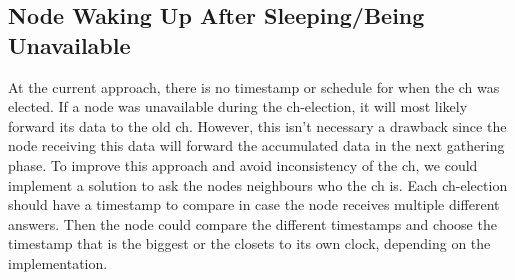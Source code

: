 \documentclass[USenglish]{uit-thesis}
\begin{document}



\subsection{Node Waking Up After Sleeping/Being Unavailable}




At the current approach, there is no timestamp or schedule for when the \gls{ch} was elected. If a node was unavailable during the \gls{ch}-election, it will most likely forward its data to the old \gls{ch}. However, this isn't necessary a drawback since the node receiving this data will forward the accumulated data in the next gathering phase.
To improve this approach and avoid inconsistency of the \gls{ch}, we could implement a solution to ask the nodes neighbours who the \gls{ch} is. Each \gls{ch}-election should have a timestamp to compare in case the node receives multiple different answers. Then the node could compare the different timestamps and choose the timestamp that is the biggest or the closets to its own clock, depending on the implementation. 

\end{document}
